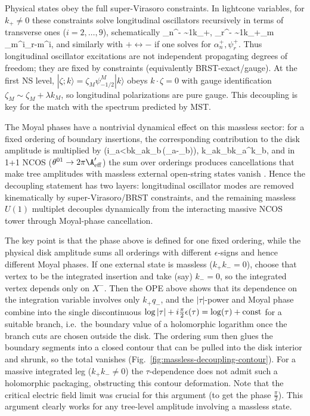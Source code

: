 \documentclass[12pt]{article}
\begin{document}
\fe
Physical states obey the full super-Virasoro constraints. In lightcone variables, for $k_+\neq 0$ these constraints solve longitudinal oscillators recursively in terms of transverse ones ($i=2,\dots,9$), schematically
\ie
\alpha_n^- \sim {1\over k_+}\!,\qquad
\psi_r^- \sim {1\over k_+}\sum_m \alpha_m^i\psi_{r-m}^i,
\fe
and similarly with $+\leftrightarrow -$ if one solves for $\alpha_n^+,\psi_r^+$. Thus longitudinal oscillator excitations are not independent propagating degrees of freedom; they are fixed by constraints (equivalently BRST-exact/gauge).
At the first NS level, $|\zeta;k\rangle=\zeta_M\psi_{-1/2}^M|k\rangle$ obeys $k\!\cdot\!\zeta=0$ with gauge identification $\zeta_M\sim \zeta_M+\lambda k_M$, so longitudinal polarizations are pure gauge. This decoupling is key for the match with the spectrum predicted by MST.

The Moyal phases have a nontrivial dynamical effect on this massless sector: for a fixed ordering of boundary insertions, the corresponding contribution to the disk amplitude is multiplied by
\ie
\exp\!\left({i}\sum_{a<b}k_a\wedge k_b\,\epsilon(\tau_a-\tau_b)\right),\qquad
k_a\wedge k_b\equiv k_{a\alpha}\theta^{\alpha\beta}k_{b\beta},
\fe
and in 1+1 NCOS ($\theta^{01}\to 2\pi\A'_{\rm eff}$) the sum over orderings produces cancellations that make tree amplitudes with massless external open-string states vanish \cite{klebanov200011dimensionalncosun,herzog2000stablemassivestates11,seiberg2000stringsbackgroundelectricfield}. Hence the decoupling statement has two layers: longitudinal oscillator modes are removed kinematically by super-Virasoro/BRST constraints, and the remaining massless $U(1)$ multiplet decouples dynamically from the interacting massive NCOS tower through Moyal-phase cancellation.

The key point is that the phase above is defined for one fixed ordering, while the physical disk amplitude sums all orderings with different $\epsilon$-signs and hence different Moyal phases. If one external state is massless ($k_+k_-=0$), choose that vertex to be the integrated insertion and take (say) $k_-=0$, so the integrated vertex depends only on $X^-$. Then the OPE above shows that its dependence on the integration variable involves only $k_+q_-$, and the $|\tau|$-power and Moyal phase combine into the single discontinuous $\log|\tau|+i{\pi\over2}\epsilon(\tau)=\log(\tau)+{\rm const}$ for a suitable branch, i.e.\ the boundary value of a holomorphic logarithm once the branch cuts are chosen outside the disk. The ordering sum then glues the boundary segments into a closed contour that can be pulled into the disk interior and shrunk, so the total vanishes (Fig.~\ref{fig:massless-decoupling-contour}). For a massive integrated leg ($k_+k_-\neq 0$) the $\tau$-dependence does not admit such a holomorphic packaging, obstructing this contour deformation. Note that the critical electric field limit was crucial for this argument (to get the phase $\frac{\pi}{2}$). This argument clearly works for any tree-level amplitude involving a massless state.
\end{document}
